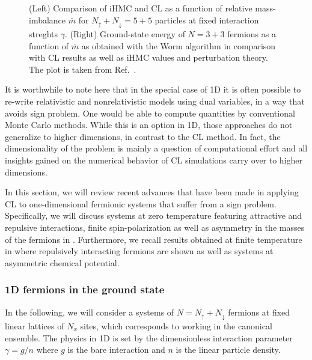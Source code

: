 \documentclass[../main.tex]{subfiles}
\begin{document}
\begin{figure}[t]
\begin{subfigure}[t]{0.4\columnwidth}
  \end{subfigure}
  \caption{\label{fig:1d_mib_eos} (Left) Comparison of iHMC and CL as a function of relative mass-imbalance $\bar m$ for $N_\uparrow+N_\downarrow = 5+5$ particles at fixed interaction streghts $\gamma$. (Right) Ground-state energy of $N = 3 + 3$ fermions as a function of $\bar m$ as obtained with the Worm algorithm \cite{PhysRevD.99.074511} in comparison with CL results as well as iHMC values and perturbation theory. The plot is taken from Ref.~\cite{PhysRevD.99.074511}.}
\end{figure}
%

It is worthwhile to note here that in the special case of 1D it is often possible to re-write relativistic and nonrelativistic models using dual variables, in a way that avoids sign problem. One would be able to compute quantities by conventional Monte Carlo methods. While this is an option in 1D, those approaches do not generalize to higher dimensions, in contrast to the CL method. In fact, the dimensionality of the problem is mainly a question of computational effort and all insights gained on the numerical behavior of CL simulations carry over to higher dimensions.

In this section, we will review recent advances that have been made in applying CL to one-dimensional fermionic systems that suffer from a sign problem. Specifically, we will discuss systems at zero temperature featuring attractive and repulsive interactions, finite spin-polarization as well as asymmetry in the masses of the fermions in . Furthermore, we recall results obtained at finite temperature in  where repulsively interacting fermions are shown as well as systems at asymmetric chemical potential.

\subsubsection{1D fermions in the ground state \label{sect:fermions_gs_1d}}
In the following, we will consider a systems of $N = N_\uparrow + N_\downarrow$ fermions at fixed linear lattices of $N_x$ sites, which corresponds to working in the canonical ensemble. The physics in 1D is set by the dimensionless interaction parameter $\gamma = g/n$ where $g$ is the bare interaction and $n$ is the linear particle density.
\end{document}
